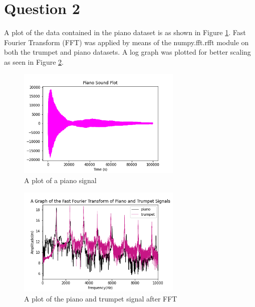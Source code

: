 \documentclass[11pt]{article}
\begin{document}
	
	
	
	
	
	\section{Question 2}
	A plot of the data contained in the piano dataset is as shown in Figure \ref{fig:piano}.
	Fast Fourier Transform (FFT) was applied by means of the numpy.fft.rfft module on both the trumpet and piano datasets. A log graph was plotted for better scaling as seen in Figure \ref{fig:piano_trumpet}.
	
	\begin{figure}[!htb]\begin{center} 
			\vspace{12pt}
			\includegraphics[width=0.7\textwidth]{piano.png}
			\caption{A plot of a piano signal}
			\label{fig:piano} 
		\end{center}
	\end{figure}
	
	\begin{figure}[!htb]\begin{center} 
			\vspace{12pt}
			\includegraphics[width=0.7\textwidth]{piano_vs_trumpet_fft.png}
			\caption{A plot of the piano and trumpet signal after FFT}
			\label{fig:piano_trumpet} 
		\end{center}
	\end{figure}
	
\end{document}
